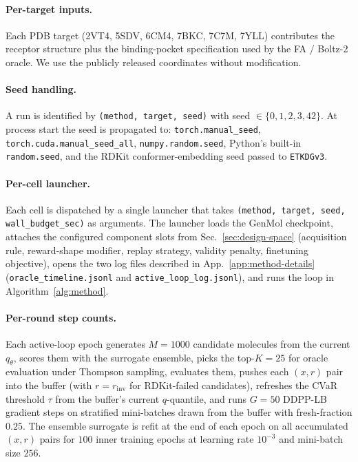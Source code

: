 \documentclass{article}
\begin{document}
\paragraph{Per-target inputs.} Each PDB target (2VT4, 5SDV, 6CM4, 7BKC, 7C7M, 7YLL) contributes the receptor structure plus the binding-pocket specification used by the FA / Boltz-2 oracle. We use the publicly released coordinates without modification.

\paragraph{Seed handling.} A run is identified by \texttt{(method, target, seed)} with seed $\in \{0, 1, 2, 3, 42\}$. At process start the seed is propagated to: \texttt{torch.manual\_seed}, \texttt{torch.cuda.manual\_seed\_all}, \texttt{numpy.random.seed}, Python's built-in \texttt{random.seed}, and the RDKit conformer-embedding seed passed to \texttt{ETKDGv3}.

\paragraph{Per-cell launcher.} Each cell is dispatched by a single launcher that takes \texttt{(method, target, seed, wall\_budget\_sec)} as arguments. The launcher loads the GenMol checkpoint, attaches the configured component slots from Sec.~\ref{sec:design-space} (acquisition rule, reward-shape modifier, replay strategy, validity penalty, finetuning objective), opens the two log files described in App.~\ref{app:method-details} (\texttt{oracle\_timeline.jsonl} and \texttt{active\_loop\_log.jsonl}), and runs the loop in Algorithm~\ref{alg:method}.

\paragraph{Per-round step counts.} Each active-loop epoch generates $M{=}1000$ candidate molecules from the current $q_\theta$, scores them with the surrogate ensemble, picks the top-$K{=}25$ for oracle evaluation under Thompson sampling, evaluates them, pushes each $(x, r)$ pair into the buffer (with $r{=}r_{\text{inv}}$ for RDKit-failed candidates), refreshes the CVaR threshold $\tau$ from the buffer's current $q$-quantile, and runs $G{=}50$ DDPP-LB gradient steps on stratified mini-batches drawn from the buffer with fresh-fraction $0.25$. The ensemble surrogate is refit at the end of each epoch on all accumulated $(x, r)$ pairs for $100$ inner training epochs at learning rate $10^{-3}$ and mini-batch size $256$.
\end{document}
